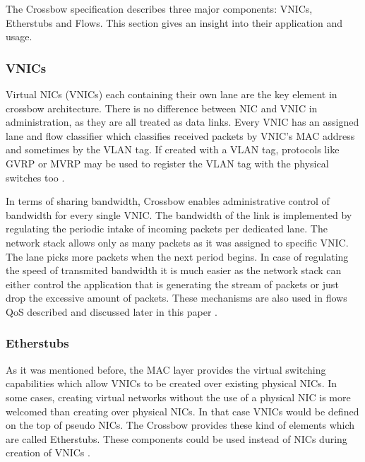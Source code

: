 \documentclass[11pt]{book}
\begin{document}
        The Crossbow specification describes three major components: VNICs, Etherstubs and Flows. This section gives an
        insight into their application and usage.

                
        \subsubsection{VNICs}
        
          Virtual NICs (VNICs) each containing their own lane are the key element in crossbow architecture. There is no
          difference between NIC and VNIC in administration, as they are all treated as data links. Every VNIC has an
          assigned lane and flow classifier which classifies received packets by VNIC's MAC address and sometimes by the
          VLAN tag.  If created with a VLAN tag, protocols like GVRP or MVRP may be used to register the VLAN tag with
          the physical switches too \cite{crossbow}.	

          In terms of sharing bandwidth, Crossbow enables administrative control of bandwidth for every single VNIC. The
          bandwidth of the link is implemented by regulating the periodic intake of incoming packets per dedicated lane.
          The network stack allows only as many packets as it was assigned to specific VNIC. The lane picks more packets
          when the next period begins. In case of regulating the speed of transmited bandwidth it is much easier as the
          network stack can either control the application that is generating the stream of packets or just drop the
          excessive amount of packets.  These mechanisms are also used in flows QoS described and discussed later in
          this paper \cite{crossbow}.


        \subsubsection{Etherstubs}

          As it was mentioned before, the MAC layer provides the virtual switching capabilities which allow VNICs to be
          created over existing physical NICs.  In some cases, creating virtual networks without the use of a physical
          NIC is more welcomed than creating over physical NICs. In that case VNICs would be defined on the top of
          pseudo NICs.  The Crossbow provides these kind of elements which are called Etherstubs. These components could
          be used instead of NICs during creation of VNICs \cite{crossbow}.
\end{document}
